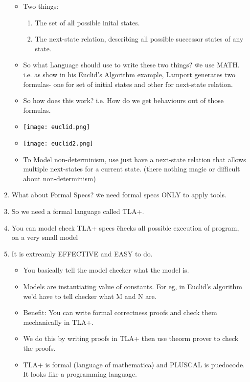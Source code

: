\documentclass{article}
\begin{document}
\begin{enumerate}
\begin{itemize}
            \item Two things: \begin{enumerate}
                \item The set of all possible inital states.
                \item The next-state relation, describing all possible successor states of any state. 
            \end{enumerate}
            \item So what Language should use to write these two things? \= we use MATH. i.e. as show in his Euclid's Algorithm example, Lamport generates two formulas- one for set of initial states and other for next-state relation. 
            \item So how does this work? i.e. How do we get behaviours out of those formulas.
            \item \texttt{[image: euclid.png]}
            \item \texttt{[image: euclid2.png]}
            \item To Model non-determinism, use just have a next-state relation that allows multiple next-states for a current state. (there nothing magic or difficult about non-determinism)
        \end{itemize}
        \item What about Formal Specs? \= we need formal specs ONLY to apply tools. 
        \item So we need a formal language called TLA+.
        \item You can model check TLA+ specs \= checks all possible execution of program, on a very small model
        \item It is extreamly EFFECTIVE and EASY to do. \begin{itemize}
            \item You basically tell the model checker what the model is.
            \item Models are instantiating value of constants. For eg, in Euclid's algorithm we'd have to tell checker what M and N are. 
            \item Benefit: You can write formal correctness proofs and check them mechanically in TLA+.
            \item We do this by writing proofs in TLA+ then use theorm prover to check the proofs.
            \item TLA+ is formal (language of mathematica) and PLUSCAL is puedocode. It looks like a programming language.

\end{itemize}
\end{enumerate}
\end{document}
